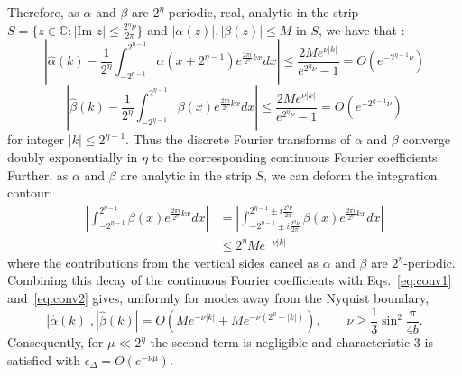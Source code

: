 \documentclass[aps,floatfix,10pt,amssymb,amsfont,amsmath,superscriptaddress,float,nofootinbib,longbibliography,nobalancelastpage,twocolumn]{revtex4-2}
\begin{document}
Therefore, as $\alpha$ and $\beta$ are $2^{\eta}$-periodic, real, analytic in the strip $S =\{z \in \mathbb{C}: |\text{Im } z| \leq \frac{2^{\eta}\nu}{2\pi}\}$ and $|\alpha(z)|, |\beta(z)| \leq M$ in $S$, we have that \cite{trefethen2014exponentially}:
\begin{equation}
\label{eq:conv1}
    \left|\hat\alpha(k) - \frac{1}{2^{\eta}}\int_{-2^{\eta-1}}^{2^{\eta-1}}\alpha(x+2^{\eta-1})e^{\frac{2\pi i}{2^{\eta}}kx} dx\right| \leq \frac{2 Me^{\nu |k|}}{e^{2^{\eta}\nu}-1} = O(e^{-2^{\eta-1}\nu})
\end{equation}
\begin{equation}
\label{eq:conv2}
    \left|\hat\beta(k) - \frac{1}{2^{\eta}}\int_{-2^{\eta-1}}^{2^{\eta-1}}\beta(x)e^{\frac{2\pi i}{2^{\eta}}kx} dx\right| \leq  \frac{2 Me^{\nu |k|}}{e^{2^{\eta}\nu}-1} = O(e^{-2^{\eta-1}\nu})
\end{equation}
for integer $|k| \leq 2^{\eta-1}$. Thus the discrete Fourier transforms of $\alpha$ and $\beta$ converge doubly exponentially in $\eta$ to the corresponding continuous Fourier coefficients. Further, as $\alpha$ and $\beta$ are analytic in the strip $S$, we can deform the integration contour:
\begin{align}
    \left|\int_{-2^{\eta-1}}^{2^{\eta-1}}\beta(x)e^{\frac{2\pi i}{2^{\eta}}kx} dx\right| &=\left| \int_{-2^{\eta-1}\pm i\frac{2^{\eta}\nu}{2\pi}}^{2^{\eta-1}\pm i\frac{2^{\eta}\nu}{2\pi}}\beta(x)e^{\frac{2\pi i}{2^{\eta}}kx} dx\right|\\
    &\leq 2^{\eta}Me^{-\nu|k|}
    \label{eq:tails}
\end{align}
where the contributions from the vertical sides cancel as $\alpha$ and $\beta$ are $2^{\eta}$-periodic. Combining this decay of the continuous Fourier coefficients with Eqs.~\eqref{eq:conv1} and~\eqref{eq:conv2} gives, uniformly for modes away from the Nyquist boundary,
\begin{equation}
\label{eq:exactdecay}
    |\hat \alpha(k)|, |\hat \beta(k)| = O\!\left(M e^{-\nu|k|}
    +M e^{-\nu(2^{\eta}-|k|)}\right),
    \qquad \nu\geq\frac13\sin^2\frac{\pi}{4b}.
\end{equation}
Consequently, for $\mu\ll 2^{\eta}$ the second term is negligible and characteristic 3 is satisfied with $\epsilon_{\Delta}=O(e^{-\nu\mu})$.
\end{document}
